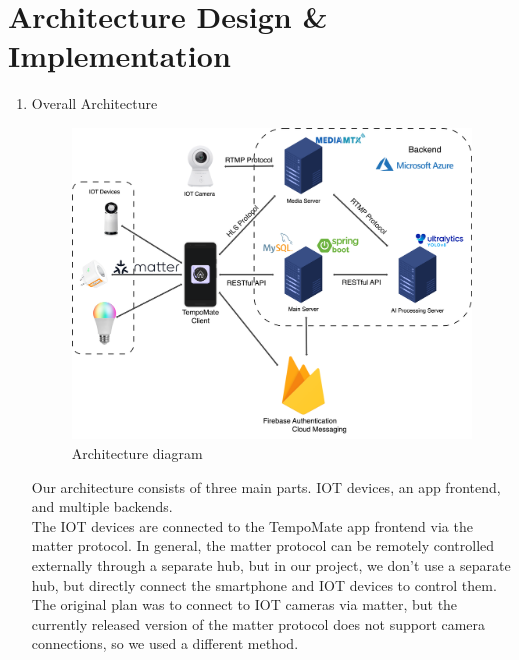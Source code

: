 \newcommand{\addImage}[2]{
  \begin{figure}[!htb]
    \begin{center}
      \texttt{[image: \#1]}
      \caption{#2} %
      \renewcommand{\thefigure}{\thesubsection.\arabic{figure}}
    \end{center}
  \end{figure}
}

\newpage
\section{\Large{Architecture Design \& Implementation}}

\begin{enumerate}[label=\arabic*]
  \item {\large{Overall Architecture}}\\
    \begin{figure}[!ht]
        \begin{center}
            \includegraphics[width=14cm]{imgs/architecture.drawio.png}
            \caption{Architecture diagram} %
            \renewcommand{\thefigure}{\thesubsection.\arabic{figure}}
        \end{center}
    \end{figure}
    Our architecture consists of three main parts. IOT devices, an app frontend, and multiple backends.\\
    
    The IOT devices are connected to the TempoMate app frontend via the matter protocol. In general, the matter protocol can be remotely controlled externally through a separate hub, but in our project, we don't use a separate hub, but directly connect the smartphone and IOT devices to control them. The original plan was to connect to IOT cameras via matter, but the currently released version of the matter protocol does not support camera connections, so we used a different method.\\
     

\end{enumerate}
